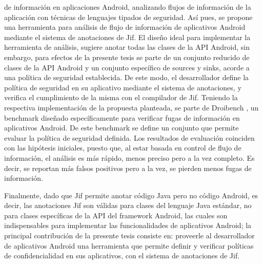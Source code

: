 de información en aplicaciones Android, analizando flujos de información de la
aplicación con técnicas de lenguajes tipados de seguridad.\newline 
Así pues, se propone una herramienta para análisis de flujo de información de
aplicativos Android mediante el sistema de anotaciones de Jif.\newline 
El diseño ideal para implementar la herramienta de análisis, sugiere anotar
todas las clases de la API Android, sin embargo, para efectos de la presente
tesis se parte de un conjunto reducido de clases de la API Android y un conjunto
específico de sources y sinks, acorde a una política de seguridad establecida. 
De este modo, el desarrollador define la política de seguridad en su aplicativo
mediante el sistema de anotaciones, y verifica el cumplimiento de la misma con
el compilador de Jif.\newline 
Teniendo la respectiva implementación de la propuesta planteada, se parte de
Droibench \cite{DroidBenchBenchmarks}, un benchmark diseñado específicamente
para verificar fugas de información en aplicativos Android. De este benchmark se
define un conjunto que permite evaluar la política de seguridad definida.\newline
Los resultados de evaluación coinciden con las hipótesis iniciales, puesto que,
al estar basada en control de flujo de información, el análisis es más rápido,
menos preciso pero a la vez completo. Es decir, se reportan más falsos positivos
pero a la vez, se pierden menos fugas de información.

Finalmente, dado que Jif permite
anotar código Java pero no código Android, es decir, las anotaciones Jif son
válidas para clases del lenguaje Java estándar, no para clases específicas de la
API del framework Android, las cuales son indispensables para
implementar las funcionalidades de aplicativos Android; la principal
contribución de la presente tesis consiste en: proveerle al desarrollador de
aplicativos Android una herramienta que permite definir y verificar políticas de
confidencialidad en sus aplicativos, con el sistema de anotaciones de
Jif.\newline


